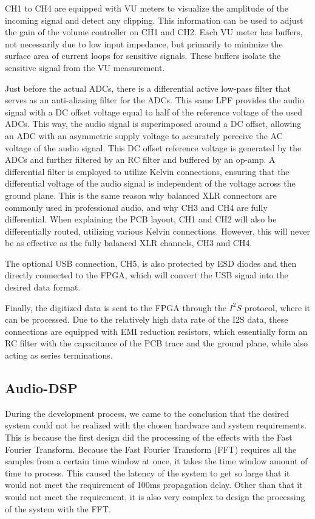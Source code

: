 CH1 to CH4 are equipped with VU meters to visualize the amplitude of the incoming signal and detect any clipping. This information can be used to adjust the gain of the volume controller on CH1 and CH2. Each VU meter has buffers, not necessarily due to low input impedance, but primarily to minimize the surface area of current loops for sensitive signals. These buffers isolate the sensitive signal from the VU measurement.

Just before the actual ADCs, there is a differential active low-pass filter that serves as an anti-aliasing filter for the ADCs. This same LPF provides the audio signal with a DC offset voltage equal to half of the reference voltage of the used ADCs. This way, the audio signal is superimposed around a DC offset, allowing an ADC with an asymmetric supply voltage to accurately perceive the AC voltage of the audio signal. This DC offset reference voltage is generated by the ADCs and further filtered by an RC filter and buffered by an op-amp. A differential filter is employed to utilize Kelvin connections, ensuring that the differential voltage of the audio signal is independent of the voltage across the ground plane. This is the same reason why balanced XLR connectors are commonly used in professional audio, and why CH3 and CH4 are fully differential. When explaining the PCB layout, CH1 and CH2 will also be differentially routed, utilizing various Kelvin connections. However, this will never be as effective as the fully balanced XLR channels, CH3 and CH4.

The optional USB connection, CH5, is also protected by ESD diodes and then directly connected to the FPGA, which will convert the USB signal into the desired data format.

Finally, the digitized data is sent to the FPGA through the $I^2S$ protocol, where it can be processed. Due to the relatively high data rate of the I2S data, these connections are equipped with EMI reduction resistors, which essentially form an RC filter with the capacitance of the PCB trace and the ground plane, while also acting as series terminations.

\subsection{Audio-DSP}
During the development process, we came to the conclusion that the desired system could not be realized with the chosen hardware and system requirements. This is because the first design did the processing of the effects with the Fast Fourier Transform. Because the Fast Fourier Transform (FFT) requires all the samples from a certain time window at once, it takes the time window amount of time to process. This caused the latency of the system to get so large that it would not meet the requirement of 100ms propagation delay. Other than that it would not meet the requirement, it is also very complex to design the processing of the system with the FFT.

